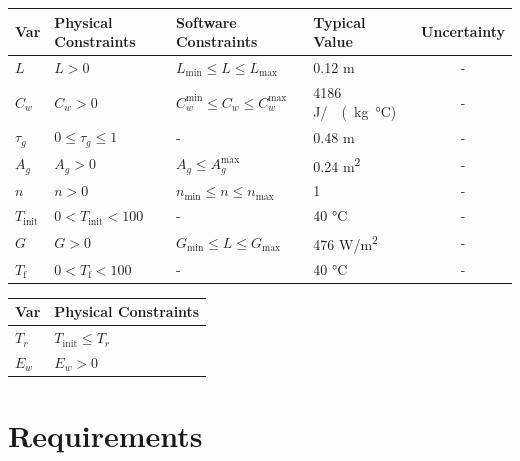 \documentclass[12pt]{article}
\begin{document}
\begin{table}[!h]
  \caption{Input Variables} \label{TblInputVar}
  \renewcommand{\arraystretch}{1.2}
\noindent \begin{longtable*}{l l l l c} 
  \toprule
  \textbf{Var} & \textbf{Physical Constraints} & \textbf{Software Constraints} &
                             \textbf{Typical Value} & \textbf{Uncertainty}\\
  \midrule 
  $L$ & $L > 0$ & $L_{\text{min}} \leq L \leq L_{\text{max}}$ & 0.12 \si[per-mode=symbol] {\metre} & -
  \\
  $C_w$ & $C_w > 0$ & $C_w^\text{min} \leq C_w \leq C_w^\text{max}$ & 4186 \si[per-mode=symbol] {\joule\per\ (kg \celsius})    & - 
  \\
  $\tau_g$ & $0 \leq \tau_g \leq 1$ & - & 0.48 \si[per-mode=symbol] {\metre} & - 
  \\
  $A_g$ & $A_g > 0$ & $A_g \leq A_g^\text{max}$ & 0.24 \si[per-mode=symbol] {\square\metre}   & - 
  \\
  $n$ & $n > 0$ & $n_\text{min} \leq n \leq n_\text{max} $ & 1  & - 
  \\
  $T_\text{init}$ & $0 < T_\text{init} < 100$ & - & 40 \si[per-mode=symbol] {\celsius} & - 
  \\
  $G$ & $G > 0$ & $G_{\text{min}} \leq L \leq G_{\text{max}}$ & 476 \si[per-mode=symbol] {\watt\per\square\metre} & - 
  \\
  $T_\text{f}$ & $0 < T_\text{f} < 100$ & - & 40 \si[per-mode=symbol] {\celsius} & - 
  \\
  
  \bottomrule
\end{longtable*}
\end{table}


\begin{table}[!h]
\caption{Output Variables} \label{TblOutputVar}
\renewcommand{\arraystretch}{1.2}
\noindent \begin{longtable*}{l l} 
  \toprule
  \textbf{Var} & \textbf{Physical Constraints} \\
  \midrule 
  $T_r$ & $T_\text{init} \leq T_r $
  \\
  $E_w$ & $E_w > 0$ \\
  \bottomrule
\end{longtable*}
\end{table}


\section{Requirements}
\end{document}
